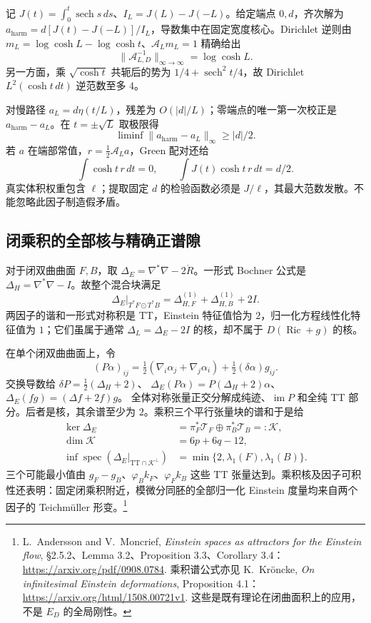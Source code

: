 \documentclass[UTF8,fontset=fandol,zihao=-4,oneside,openany]{ctexbook}
\theoremstyle{cjkplain}
\numberwithin{equation}{chapter}
\begin{document}
记 $J(t)=\int_0^t\operatorname{sech}s\,ds$、$I_L=J(L)-J(-L)$。给定端点 $0,d$，齐次解为
$a_{\mathrm{harm}}=d[J(t)-J(-L)]/I_L$，导数集中在固定宽度核心。Dirichlet 逆则由
$m_L=\log\cosh L-\log\cosh t$、$\mathcal A_Lm_L=1$ 精确给出
\begin{equation}
 \|\mathcal A_{L,D}^{-1}\|_{\infty\to\infty}=\log\cosh L.
 \label{BUN:exact-inverse}
\end{equation}
另一方面，乘 $\sqrt{\cosh t}$ 共轭后的势为
$1/4+\operatorname{sech}^2t/4$，故 Dirichlet $L^2(\cosh t\,dt)$ 逆范数至多 $4$。

对慢路径 $a_L=d\eta(t/L)$，残差为 $O(|d|/L)$；零端点的唯一第一次校正是 $a_{\mathrm{harm}}-a_L$。在 $t=\pm\sqrt L$ 取极限得
\[
 \liminf\|a_{\mathrm{harm}}-a_L\|_\infty\ge|d|/2.
\]
若 $a$ 在端部常值，$r=\frac12\mathcal A_La$，Green 配对还给
\[
 \int\cosh t\,r\,dt=0,
 \qquad\int J(t)\cosh t\,r\,dt=d/2.
\]
真实体积权重包含 $\ell$；提取固定 $d$ 的检验函数必须是 $J/\ell$，其最大范数发散。不能忽略此因子制造假矛盾。

\subsection{闭乘积的全部核与精确正谱隙}
对于闭双曲曲面 $F,B$，取 $\Delta_E=\nabla^*\nabla-2\mathring R$。一形式 Bochner 公式是
$\Delta_H=\nabla^*\nabla-I$。故整个混合块满足
\begin{equation}
 \Delta_E|_{T^*F\odot T^*B}
 =\Delta_{H,F}^{(1)}+\Delta_{H,B}^{(1)}+2I.
 \label{BUN:mixed-gap}
\end{equation}
两因子的谐和一形式对称积是 TT，Einstein 特征值恰为 $2$，归一化方程线性化特征值为 $1$；它们虽属于通常 $\Delta_L=\Delta_E-2I$ 的核，却不属于 $D(\operatorname{Ric}+g)$ 的核。

在单个闭双曲曲面上，令
\[
 (P\alpha)_{ij}=\tfrac12(\nabla_i\alpha_j+\nabla_j\alpha_i)
 +\tfrac12(\delta\alpha)g_{ij}.
\]
交换导数给
$\delta P=\frac12(\Delta_H+2)$、
$\Delta_E(P\alpha)=P(\Delta_H+2)\alpha$、
$\Delta_E(fg)=(\Delta f+2f)g$。
全体对称张量正交分解成纯迹、$\operatorname{im}P$ 和全纯 TT 部分。后者是核，其余谱至少为 $2$。乘积三个平行张量块的谱和于是给
\begin{equation}
 \begin{aligned}
 \ker\Delta_E&=\pi_F^*\mathcal T_F\oplus\pi_B^*\mathcal T_B=: \mathcal K,\\
 \dim\mathcal K&=6p+6q-12,\\
 \inf\operatorname{spec}(\Delta_E|_{\mathrm{TT}\cap\mathcal K^\perp})
 &=\min\{2,\lambda_1(F),\lambda_1(B)\}.
 \end{aligned}
 \label{BUN:exact-product-gap}
\end{equation}
三个可能最小值由 $g_F-g_B$、$\varphi_Bk_F$、$\varphi_Fk_B$ 这些 TT 张量达到。乘积核及因子可积性还表明：固定闭乘积附近，模微分同胚的全部归一化 Einstein 度量均来自两个因子的 Teichmüller 形变。\footnote{L.~Andersson and V.~Moncrief, \emph{Einstein spaces as attractors for the Einstein flow}, \S2.5.2、Lemma 3.2、Proposition 3.3、Corollary 3.4：\url{https://arxiv.org/pdf/0908.0784}. 乘积谱公式亦见 K.~Kröncke, \emph{On infinitesimal Einstein deformations}, Proposition 4.1：\url{https://arxiv.org/html/1508.00721v1}. 这些是既有理论在闭曲面积上的应用，不是 $E_D$ 的全局刚性。}
\end{document}

